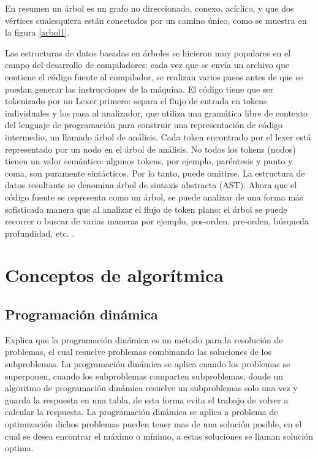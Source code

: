 En resumen un árbol es un grafo no direccionado, conexo, acíclico, y que dos vértices cualesquiera están conectados por un camino único, como se muestra en la figura \ref{arbol1}.

Las estructuras de datos basadas en árboles se hicieron muy populares en el campo del desarrollo de compiladores: cada vez que se envía un archivo que contiene el código fuente al compilador, se realizan varios pasos antes de que se puedan generar las instrucciones de la máquina. El código tiene que ser tokenizado por un Lexer primero: separa el flujo de entrada en tokens individuales y los pasa al analizador, que utiliza una gramática libre de contexto del lenguaje de programación para construir una representación de código intermedio, un llamado árbol de análisis.
Cada token encontrado por el lexer está representado por un nodo en el árbol de análisis. No todos los tokens (nodos) tienen un valor semántico: algunos tokens, por ejemplo, paréntesis y punto y coma, son puramente sintácticos. Por lo tanto, puede omitirse. La estructura de datos resultante se denomina árbol de sintaxis abstracta (AST).
Ahora que el código fuente se representa como un árbol, se puede analizar de una forma más sofisticada manera que al analizar el flujo de token plano: el árbol se puede recorrer o buscar de varias maneras por ejemplo, pos-orden, pre-orden, búsqueda profundidad, etc. \cite{ChangeDistiller}.

\section{Conceptos de algorítmica}

\subsection{Programación dinámica}
\cite{Cormen2009} Explica que la programación dinámica es un método para la resolución de problemas, el cual resuelve problemas combinando las soluciones de los subproblemas. La programación dinámica se aplica cuando los problemas se superponen, cuando los subproblemas comparten subproblemas, donde un algoritmo de programación dinámica resuelve un subproblemas solo una vez y guarda la respuesta en una tabla, de esta forma evita el trabajo de volver a calcular la respuesta. La programación dinámica se aplica a problema de optimización dichos problemas pueden tener mas de una solución posible, en el cual se desea encontrar el máximo o mínimo, a estas soluciones se llaman solución optima.\\

